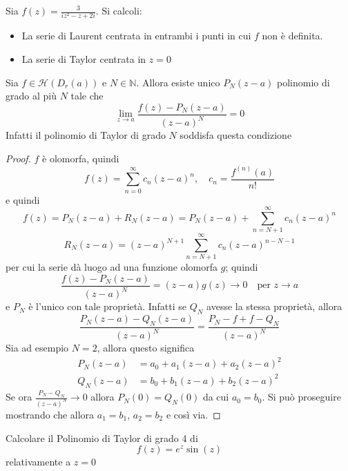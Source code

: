 \begin{eser}
    Sia \(\displaystyle f{(z)} = \frac{3}{iz^2 - z + 2i}\). Si calcoli:
\begin{itemize}[label = --]
    \item La serie di Laurent centrata in entrambi i punti in cui \(f\) non è
        definita.
    \item La serie di Taylor centrata in \(z=0\) 
\end{itemize}
\end{eser}

\begin{eser}
    Sia \(f \in \mathcal{H}{(D_{r} {(a)})}\) e \(N \in \mathbb{N}\). Allora
    esiste unico \(P_N{(z-a)}\) polinomio di grado al più \(N\) tale che 
\[
    \lim_{z \to a} \frac{f{(z)} - P_N{(z-a)}}{{(z-a)}^{N}} =0
\]
    Infatti il polinomio di Taylor di grado \(N\) soddisfa questa condizione
\begin{proof}
    \(f\) è olomorfa, quindi
\[
    f{(z)} = \sum_{n=0}^{\infty} c_{n} {(z-a)}^{n}, \quad c_{n} =
    \frac{f^{{(n)}}{(a)}}{n!}
\]
    e quindi
\[
    f{(z)} = P_N{(z-a)} + R_N{(z-a)} = P_N{(z-a)} + \sum_{n=N+1}^{\infty}
    c_{n}{(z-a)}^{n}
\]
\[
    R_N{(z-a)} = {(z-a)}^{N+1}\sum_{n=N+1}^{\infty} c_{n}{(z-a)}^{n-N-1} 
\]
    per cui la serie dà luogo ad una funzione olomorfa \(g\); quindi
\[
    \frac{f{(z)} - P_N{(z-a)}}{{(z-a)}^{N}} = {(z-a)}g{(z)} \to 0 \quad \text{
    per } z \to a
\] 
    e \(P_N\) è l'unico con tale proprietà. Infatti se \(Q_N\) avesse la stessa
    proprietà, allora
\[
    \frac{P_N{(z-a)} - Q_N{(z-a)}}{{(z-a)}^{N}} = \frac{P_N - f + f -
    Q_N}{{(z-a)}^{N}}
\]
    Sia ad esempio \(N = 2\), allora questo significa
    \begin{align*}
        P_N{(z-a)} &= a_{0} + a_{1}{(z-a)} + a_{2}{(z-a)}^2 \\
        Q_N{(z-a)} &= b_{0} + b_{1}{(z-a)} + b_{2}{(z-a)}^2
    \end{align*}
    Se ora \(\frac{P_N - Q_N}{{(z-a)}^{N}} \to 0\) allora \(P_N{(0)} =
    Q_N{(0)}\) da cui \(a_{0} = b_{0}\). Si può proseguire mostrando che allora
    \(a_{1} = b_{1}\), \(a_{2} = b_{2}\) e così via.
\end{proof}
\end{eser}
\begin{eser}
    Calcolare il Polinomio di Taylor di grado 4 di
\[
    f{(z)} = e^{z} \sin{(z)}
\]
    relativamente a \(z=0\) 
\end{eser}

